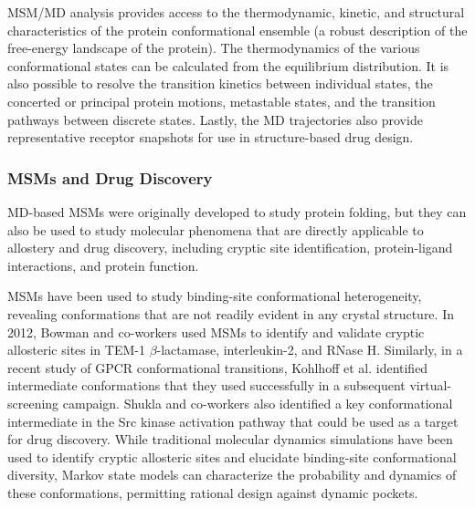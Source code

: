 \par MSM/MD analysis provides access to the thermodynamic, kinetic, and structural characteristics of the protein conformational ensemble (\ie a robust description of the free-energy landscape of the protein).\cite{Beauchamp2011a,Prinz2011c,Prinz2011d,Senne2012,Cronkite-Ratcliff2013a,Pande2010a} The thermodynamics of the various conformational states can be calculated from the equilibrium distribution. It is also possible to resolve the transition kinetics between individual states, the concerted or principal protein motions, metastable states, and the transition pathways between discrete states.\cite{Prinz2011d,Senne2012,Beauchamp2011a} Lastly, the MD trajectories also provide representative receptor snapshots for use in structure-based drug design.\cite{Cronkite-Ratcliff2013a}
\subsubsection{MSMs and Drug Discovery}
\par MD-based MSMs were originally developed to study protein folding,\cite{Lane2011a,Bowman2010a,Lapidus2014a,Schwantes2014a,Li2014f,Schor2015a,Voelz2010c} but they can also be used to study molecular phenomena that are directly applicable to allostery and drug discovery, including cryptic site identification,\cite{Bowman2012a,Bowman2015b,Kohlhoff2014} protein-ligand interactions,\cite{Buch2011,Tiwary2015} and  protein function.\cite{Lane2011a,Kohlhoff2014,Vanatta2015,Malmstrom2015}
\par MSMs have been used to study binding-site conformational heterogeneity, revealing conformations that are not readily evident in any crystal structure. In 2012, Bowman and co-workers used MSMs to identify and validate cryptic allosteric sites in TEM-1 $\beta$-lactamase, interleukin-2, and RNase H.\cite{Bowman2012a,Bowman2015b} Similarly, in a recent study of GPCR conformational transitions, Kohlhoff et al. identified intermediate conformations that they used successfully in a subsequent virtual-screening campaign.\cite{Kohlhoff2014} Shukla and co-workers also identified a key conformational intermediate in the Src kinase activation pathway that could be used as a target for drug discovery.\cite{Shukla2014b} While traditional molecular dynamics simulations have been used to identify cryptic allosteric sites and elucidate binding-site conformational diversity, Markov state models can characterize the probability and dynamics of these conformations, permitting rational design against dynamic pockets.
